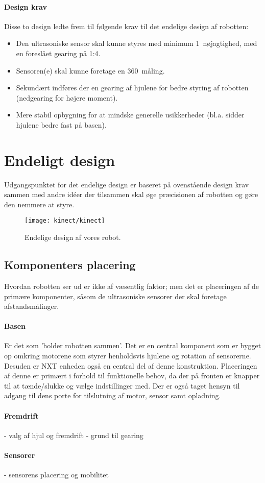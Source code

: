 \paragraph{Design krav}
Disse to design ledte frem til følgende krav til det endelige design af robotten:

\begin{itemize}
\item Den ultrasoniske sensor skal kunne styres med  minimum 1\degree~nøjagtighed, med en foreslået gearing på 1:4.
\item Sensoren(e) skal kunne foretage en 360\degree~måling.
\item Sekundært indføres der en gearing af hjulene for bedre styring af robotten (nedgearing for højere moment).
\item Mere stabil opbygning for at mindske generelle usikkerheder (bl.a. sidder hjulene bedre fast på basen).
\end{itemize} 


\section{Endeligt design}
Udgangspunktet for det endelige design er baseret på ovenstående design krav sammen med andre idéer der tilsammen skal øge præcisionen af robotten og gøre den nemmere at styre.

\begin{figure}
\centering
\texttt{[image: kinect/kinect]}
\caption{Endelige design af vores robot.}
\label{robot:opbygning}
\end{figure}

\subsection{Komponenters placering}
Hvordan robotten ser ud er ikke af væsentlig faktor; men det er placeringen af de primære komponenter, såsom de ultrasoniske sensorer der skal foretage afstandsmålinger.


\paragraph{Basen}
Er det som 'holder robotten sammen'.
Det er en central komponent som er bygget op omkring motorene som styrer henholdsvis hjulene og rotation af sensorerne.
Desuden er NXT enheden også en central del af denne konstruktion.
Placeringen af denne er primært i forhold til funktionelle behov, da der på fronten er knapper til at tænde/slukke og vælge indstillinger med.
Der er også taget hensyn til adgang til dens porte for tilslutning af motor, sensor samt opladning.

\paragraph{Fremdrift}


- valg af hjul og fremdrift
- grund til gearing

\paragraph{Sensorer}
- sensorens placering og mobilitet











